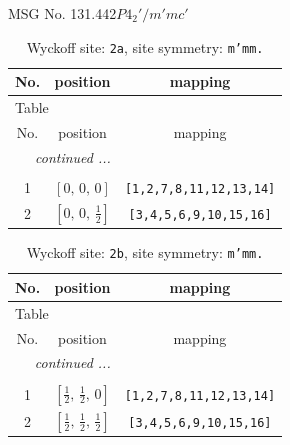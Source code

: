 \documentclass[fleqn,8pt]{jsarticle}
\begin{document}
\setcounter{MaxMatrixCols}{32}

\renewcommand{\tablename}{Table~}
\renewcommand{\figurename}{Figure~}
\begin{center}
\LARGE
MSG No. 131.442\quad$P4_{2}'/m'mc'$
\end{center}
\renewcommand{\arraystretch}{1.2}
\begin{longtable}{ccc}
\caption{Wyckoff site: {\tt 2a}, site symmetry: {\tt m'mm.}}
 \\
 \hline \hline
No. & position & mapping \\ \hline \endfirsthead

\multicolumn{2}{l}{\tablename\ \thetable{}} \\
 \hline \hline
No. & position & mapping \\ \hline \endhead

 \hline \hline
\multicolumn{2}{r}{\footnotesize\it continued ...} \\ \endfoot

 \hline \hline
\multicolumn{2}{r}{} \\ \endlastfoot

1 & $\left[ 0,\, 0,\, 0 \right]$ & {\tt [1,2,7,8,11,12,13,14]} \\ \hline
2 & $\left[ 0,\, 0,\, \frac{1}{2} \right]$ & {\tt [3,4,5,6,9,10,15,16]} \\
\end{longtable}
\renewcommand{\arraystretch}{1.2}
\begin{longtable}{ccc}
\caption{Wyckoff site: {\tt 2b}, site symmetry: {\tt m'mm.}}
 \\
 \hline \hline
No. & position & mapping \\ \hline \endfirsthead

\multicolumn{2}{l}{\tablename\ \thetable{}} \\
 \hline \hline
No. & position & mapping \\ \hline \endhead

 \hline \hline
\multicolumn{2}{r}{\footnotesize\it continued ...} \\ \endfoot

 \hline \hline
\multicolumn{2}{r}{} \\ \endlastfoot

1 & $\left[ \frac{1}{2},\, \frac{1}{2},\, 0 \right]$ & {\tt [1,2,7,8,11,12,13,14]} \\ \hline
2 & $\left[ \frac{1}{2},\, \frac{1}{2},\, \frac{1}{2} \right]$ & {\tt [3,4,5,6,9,10,15,16]} \\
\end{longtable}
\end{document}
